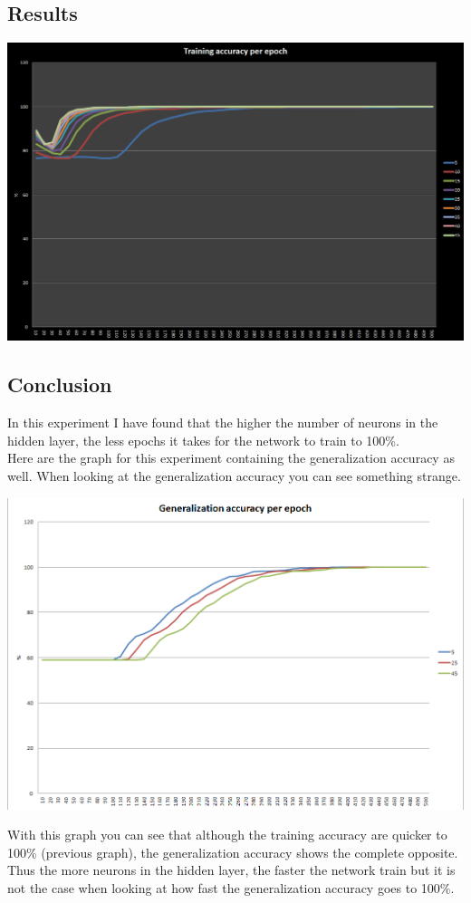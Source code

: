 \documentclass[pdftex,10pt,a4paper]{report}
\begin{document}
\subsection{Results}
\begin{center}
	\includegraphics[scale=0.5]{charts/other}
\end{center}
\subsection{Conclusion}
In this experiment I have found that the higher the number of neurons in the hidden layer, the less epochs it takes for the network to train to 100\%.\\
Here are the graph for this experiment containing the generalization accuracy as well. When looking at the generalization accuracy you can see something strange.
\begin{center}
	\includegraphics[scale=0.5]{charts/other_ag}
\end{center}
With this graph you can see that although the training accuracy are quicker to 100\% (previous graph), the generalization accuracy shows the complete opposite. Thus the more neurons in the hidden layer, the faster the network train but it is not the case when looking at how fast the generalization accuracy goes to 100\%.
\end{document}
